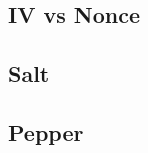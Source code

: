 \textsf{\small }

\subsection{IV vs Nonce} %

\textsf{\small }

\subsection{Salt} %



\textsf{\small }

\subsection{Pepper} %


